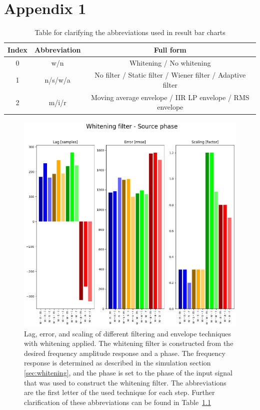 \chapter{Appendix 1} \label{app:whitening}

\begin{table} [h!]
    \begin{tabular}{ccc}
    Index & Abbreviation & Full form \\
    \hline
    0 & w/n & Whitening / No whitening \\
    1 & n/s/w/a & No filter / Static filter / Wiener filter / Adaptive filter \\
    2 & m/i/r & Moving average envelope / IIR LP envelope / RMS envelope \\
    \end{tabular}
    \caption{Table for clarifying the abbreviations used in result bar charts}
    \label{tab:abbreviation_explanation}
\end{table}

\begin{figure}[h!t]
	\begin{center}
		\includegraphics[width=1.0\columnwidth]{images/result_whitening_sourcephase.png}
	\end{center}
	\caption{Lag, error, and scaling of different filtering and envelope techniques with whitening applied. The whitening filter is constructed from the desired frequency amplitude response and a phase. The frequency response is determined as described in the simulation section \ref{sec:whitening}, and the phase is set to the phase of the input signal that was used to construct the whitening filter. The abbreviations are the first letter of the used technique for each step. Further clarification of these abbreviations can be found in Table~\ref{tab:abbreviation_explanation}}
	\label{fig:result_whitening_sourcephase}
\end{figure}

